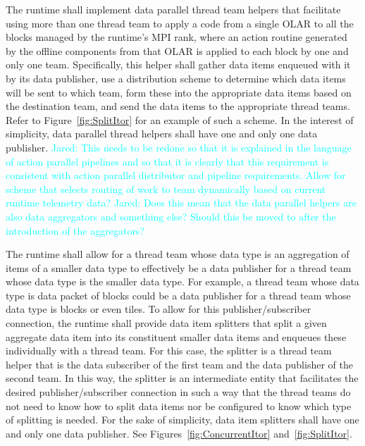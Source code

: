 \documentclass{article}
\newcommand{\Jared}[1]          {\textcolor{cyan}{Jared: #1}}
\newcommand{\shortOLAR}  {OLAR\xspace}
\newcommand{\OLAR}   {\shortOLAR}             %
\newcommand{\actionroutine}        {action routine\xspace}       %
\begin{document}
\begin{req}
The runtime shall implement data parallel thread team helpers that facilitate
using more than one thread team to apply a code from a single \OLAR to all the
blocks managed by the runtime's MPI rank, where an \actionroutine generated by
the offline components from that \OLAR is applied to each block by one and only
one team.  Specifically, this helper shall gather data items enqueued with it by
its data publisher, use a distribution scheme to determine which data items will
be sent to which team, form these into the appropriate data items based on the
destination team, and send the data items to the appropriate thread teams.
Refer to Figure~\ref{fig:SplitItor} for an example of such a scheme.  In the
interest of simplicity, data parallel thread helpers shall have one and only one
data publisher.
\Jared{This needs to be redone so that it is explained in the language of action
parallel pipelines and so that it is clearly that this requirement is consistent
with action parallel distributor and pipeline requirements.  Allow for scheme
that selects routing of work to team dynamically based on current runtime
telemetry data?}
\Jared{Does this mean that the data parallel helpers are also data aggregators
and something else?  Should this be moved to after the introduction of the
aggregators?}
\end{req}

\begin{req}
The runtime shall allow for a thread team whose data type is an aggregation of
items of a smaller data type to effectively be a data publisher for a thread
team whose data type is the smaller data type.  For example, a thread team whose
data type is data packet of blocks could be a data publisher for a thread team
whose data type is blocks or even tiles.  To allow for this publisher/subscriber
connection, the runtime shall provide data item splitters that split a given
aggregate data item into its constituent smaller data items and enqueues these
individually with a thread team.  For this case, the splitter is a thread team
helper that is the data subscriber of the first team and the data publisher of
the second team.  In this way, the splitter is an intermediate entity that
facilitates the desired publisher/subscriber connection in such a way that the
thread teams do not need to know how to split data items nor be configured to know
which type of splitting is needed.  For the sake of simplicity, data item
splitters shall have one and only one data publisher.
See Figures~\ref{fig:ConcurrentItor}
and~\ref{fig:SplitItor}.
\end{req}
\end{document}
